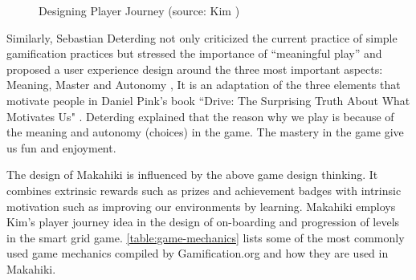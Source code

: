 \begin{figure}[ht!]
	\centering
		\caption{Designing Player Journey (source: Kim \cite {Kim2010})}
		\label{fig:design-player-journey}
\end{figure}

Similarly, Sebastian Deterding not only criticized the current practice of simple gamification practices but stressed the importance of ``meaningful play'' and proposed a user experience design around the three most important aspects: Meaning, Master and Autonomy \cite {Deterding2011meaningful}, It is an adaptation of the three elements that motivate people in Daniel Pink's book ``Drive: The Surprising Truth About What Motivates Us" \cite {pink2009drive}. Deterding explained that the reason why we play is because of the meaning and autonomy (choices) in the game. The mastery in the game give us fun and enjoyment.

The design of Makahiki is influenced by the above game design thinking. It combines extrinsic rewards such as prizes and achievement badges with intrinsic motivation such as improving our environments by learning. Makahiki employs Kim's player journey idea \cite{Kim2010} in the design of on-boarding and progression of levels in the smart grid game. \autoref{table:game-mechanics} lists some of the most commonly used game mechanics compiled by Gamification.org\cite{gamificationwiki} and how they are used in Makahiki.

